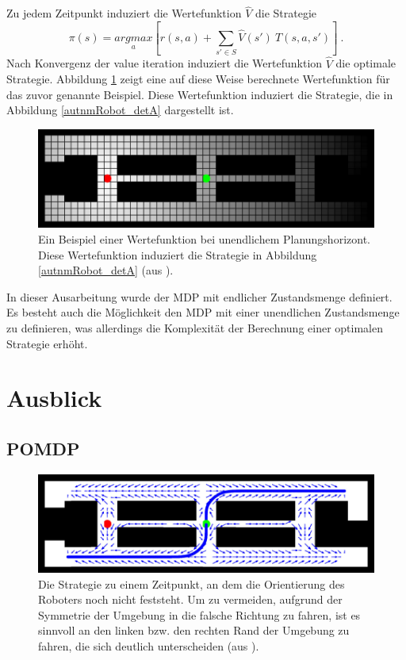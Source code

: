 \documentclass[a4paper]{IEEEtran}
\begin{document}
Zu jedem Zeitpunkt induziert die Wertefunktion $\hat{V}$ die Strategie
\begin{equation}
	\pi(s) = \underset{a}{argmax} \left[ r(s,a) + \sum_{s' \in S} \hat{V}(s')\ T(s, a, s') \right]\ .
\end{equation}
Nach Konvergenz der value iteration induziert die Wertefunktion $\hat{V}$ die optimale Strategie.
Abbildung \ref{autnmRobot_policy} zeigt eine auf diese Weise berechnete Wertefunktion für das zuvor genannte Beispiel. Diese Wertefunktion induziert die Strategie, die in Abbildung \ref{autnmRobot_detA} dargestellt ist.
\begin{figure}[ht]
	\centering
	\includegraphics[scale=0.72]{images/autnmRobot_MDPValueFunction.png}
	\caption{Ein Beispiel einer Wertefunktion bei unendlichem Planungshorizont. Diese Wertefunktion induziert die Strategie in Abbildung \ref{autnmRobot_detA} (aus \cite{thrun2005probabilistic}).}
	\label{autnmRobot_policy}
\end{figure}

In dieser Ausarbeitung wurde der MDP mit endlicher Zustandsmenge definiert. Es besteht auch die Möglichkeit den MDP mit einer unendlichen Zustandsmenge zu definieren, was allerdings die Komplexität der Berechnung einer optimalen Strategie erhöht. 


\section{Ausblick}
\label{sec:pomdp}
\subsection{POMDP}
\begin{figure}[ht]
	\centering
	\includegraphics[scale=0.72]{images/autnmRobot_POMDPPathA.png}
	\caption{Die Strategie zu einem Zeitpunkt, an dem die Orientierung des Roboters noch nicht feststeht. Um zu vermeiden, aufgrund der Symmetrie der Umgebung in die falsche Richtung zu fahren, ist es sinnvoll an den linken bzw. den rechten Rand der Umgebung zu fahren, die sich deutlich unterscheiden (aus \cite{thrun2005probabilistic}).}
	\label{autnmRobot_POMDPPathA}
\end{figure}
\end{document}
